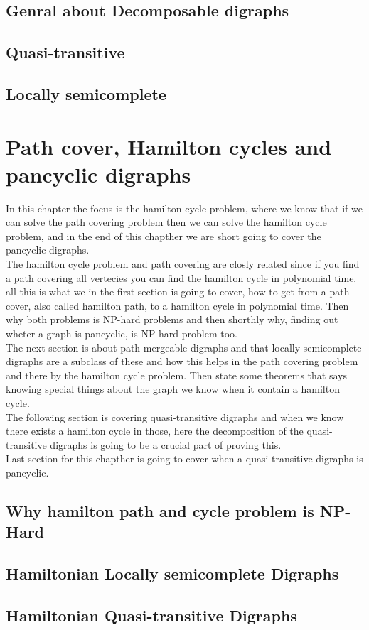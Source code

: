 \section{Genral about Decomposable digraphs}
\label{sec:gdecomposable}

\section{Quasi-transitive}
\label{sec:quasi}

\section{Locally semicomplete}
\label{sec:locally}


\chapter{Path cover, Hamilton cycles and pancyclic digraphs}
\label{chap:hamilton}
In this chapter the focus is the hamilton cycle problem, where we know that if we can solve the path covering problem then we can solve the hamilton cycle problem, and in the end of this chapther we are short going to cover the pancyclic digraphs.\\
The hamilton cycle problem and path covering are closly related since if you find a path covering all vertecies you can find the hamilton cycle in polynomial time. all this is what we in the first section is going to cover, how to get from a path cover, also called hamilton path, to a hamilton cycle in polynomial time. Then why both problems is NP-hard problems and then shorthly why, finding out wheter a graph is pancyclic, is NP-hard problem too.\\
The next section is about path-mergeable digraphs and that locally semicomplete digraphs are a subclass of these and how this helps in the path covering problem and there by the hamilton cycle problem. Then state some theorems that says knowing special things about the graph we know when it contain a hamilton cycle. \\
The following section is covering quasi-transitive digraphs and when we know there exists a hamilton cycle in those, here the decomposition of the quasi-transitive digraphs is going to be a crucial part of proving this. \\
Last section for this chapther is going to cover when a quasi-transitive digraphs is pancyclic.

\section{Why hamilton path and cycle problem is NP-Hard}
\label{sec:hNP}

\section{Hamiltonian Locally semicomplete Digraphs}
\label{sec:hlocally}

\section{Hamiltonian Quasi-transitive Digraphs}
\label{sec:hquasi}

